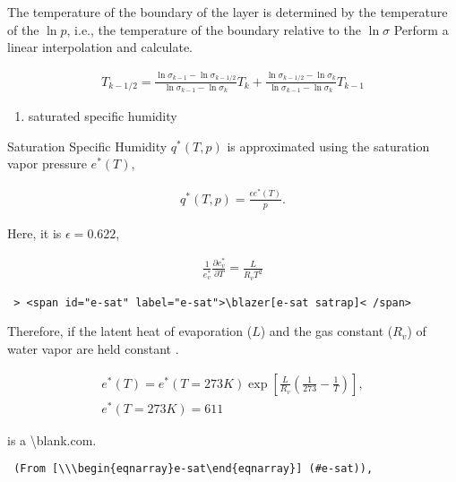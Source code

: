 The temperature of the boundary of the layer is determined by the
temperature of the \(\ln p\), i.e., the temperature of the boundary
relative to the \(\ln \sigma\) Perform a linear interpolation and
calculate.

\begin{eqnarray}
  T_{k-1/2} = \frac{\ln \sigma_{k-1} - \ln \sigma_{k-1/2}}
                   {\ln \sigma_{k-1} - \ln \sigma_k      } T_k
            + \frac{\ln \sigma_{k-1/2} - \ln \sigma_k}
                   {\ln \sigma_{k-1} - \ln \sigma_k      } T_{k-1}
\end{eqnarray}

\begin{enumerate}
\def\labelenumi{\arabic{enumi}.}
\setcounter{enumi}{4}
\tightlist
\item
  saturated specific humidity
\end{enumerate}

Saturation Specific Humidity \(q^*(T,p)\) is approximated using the
saturation vapor pressure \(e^*(T)\),

\begin{eqnarray}
q^*(T,p) = \frac{\epsilon e^*(T)}{p} .
\end{eqnarray}

Here, it is \(\epsilon=0.622\),

\begin{eqnarray}
\frac{1}{e^*_v} \frac{\partial e^*_v}{\partial T} = \frac{L}{R_v T^2}
\end{eqnarray}

\begin{verbatim}
 > <span id="e-sat" label="e-sat">\blazer[e-sat satrap]< /span>
\end{verbatim}

Therefore, if the latent heat of evaporation (\(L\)) and the gas
constant (\(R_v\)) of water vapor are held constant .

\begin{eqnarray}
e^*(T) = e^*(T=273{K})
                      \exp \left[ \frac{L}{R_v}
                            \left( \frac{1}{273} - \frac{1}{T} \right)
                       \right] ,\\
e^*(T=273{K}) = 611
\end{eqnarray}

is a \textbackslash blank\blank\blank\blank.com.

\begin{verbatim}
 (From [\\\begin{eqnarray}e-sat\end{eqnarray}] (#e-sat)),
\end{verbatim}

